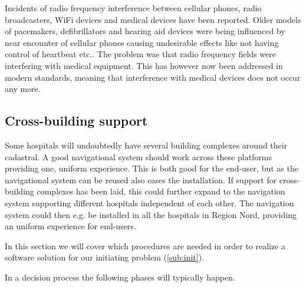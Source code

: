 Incidents of radio frequency interference between cellular phones, radio broadcasters, WiFi devices and medical devices have been reported. Older models of pacemakers, defibrillators and hearing aid devices were being influenced by near encounter of cellular phones causing undesirable effects like not having control of heartbeat etc.. The problem was that radio frequency fields were interfering with medical equipment. This has however now been addressed in modern standards, meaning that interference with medical devices does not occur any more. \cite{Man1998,Case}


\subsection{Cross-building support}

Some hospitals will undoubtedly have several building complexes around their cadastral. A good navigational system should work across these platforms providing one, uniform experience. This is both good for the end-user, but as the navigational system can be reused also eases the installation. If support for cross-building complexes has been laid, this could further expand to the navigation system supporting different hospitals independent of each other. The navigation system could then e.g. be installed in all the hospitals in Region Nord, providing an uniform experience for end-users.



In this section we will cover which procedures are needed in order to realize a software solution for our initiating problem (\cref{sub:init}).

In a decision process the following phases will typically happen. \cite{Sjaelland}

